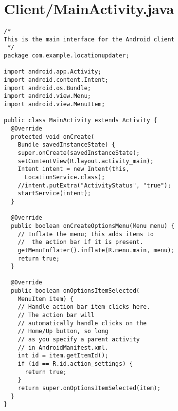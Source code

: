 \documentclass[conference]{IEEEtran}
\begin{document}
\appendices


\section{Client/MainActivity.java}

\begin{lstlisting}
/*
This is the main interface for the Android client
 */
package com.example.locationupdater;

import android.app.Activity;
import android.content.Intent;
import android.os.Bundle;
import android.view.Menu;
import android.view.MenuItem;

public class MainActivity extends Activity {
  @Override
  protected void onCreate(
    Bundle savedInstanceState) {
    super.onCreate(savedInstanceState);
    setContentView(R.layout.activity_main);
    Intent intent = new Intent(this, 
      LocationService.class);
    //intent.putExtra("ActivityStatus", "true");
    startService(intent);
  }

  @Override
  public boolean onCreateOptionsMenu(Menu menu) {
    // Inflate the menu; this adds items to
    //  the action bar if it is present.
    getMenuInflater().inflate(R.menu.main, menu);
    return true;
  }

  @Override
  public boolean onOptionsItemSelected(
    MenuItem item) {
    // Handle action bar item clicks here. 
    // The action bar will
    // automatically handle clicks on the 
    // Home/Up button, so long
    // as you specify a parent activity 
    // in AndroidManifest.xml.
    int id = item.getItemId();
    if (id == R.id.action_settings) {
      return true;
    }
    return super.onOptionsItemSelected(item);
  }
}

\end{lstlisting}
\end{document}
